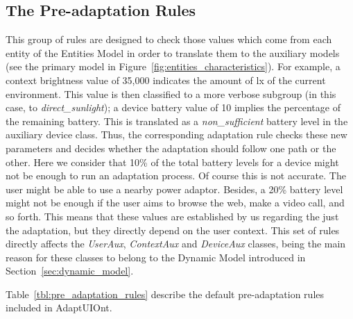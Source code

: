 \subsection{The Pre-adaptation Rules}
\label{sec:preadaptation_rules}
This group of rules are designed to check those values which come from each entity 
of the Entities Model in order to translate them to the auxiliary models (see 
the primary model in Figure~\ref{fig:entities_characteristics}). For example, a 
context brightness value of 35,000 indicates the amount of \ac{lx} of the 
current environment. This value is then classified to a more verbose subgroup 
(in this case, to \textit{direct\_sunlight}); a device battery value of 10 
implies the percentage of the remaining battery. This is translated as a 
\textit{non\_sufficient} battery level in the auxiliary device class. Thus,
the corresponding adaptation rule checks these new parameters and decides whether
the adaptation should follow one path or the other. Here we consider that 10\%
of the total battery levels for a device might not be enough to run an adaptation
process. Of course this is not accurate. The user might be able to use a nearby 
power adaptor. Besides, a 20\% battery level might not be enough if the user 
aims to browse the web, make a video call, and so forth. This means that these 
values are established by us regarding the just the adaptation, but they directly 
depend on the user context. This set of rules directly affects the 
\textit{UserAux}, \textit{ContextAux} and \textit{DeviceAux} classes, being the 
main reason for these classes to belong to the Dynamic Model introduced in 
Section~\ref{sec:dynamic_model}.

Table~\ref{tbl:pre_adaptation_rules} describe the default pre-adaptation rules
included in AdaptUIOnt.

